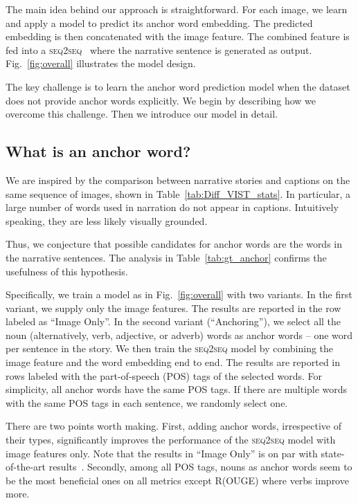 The main idea behind our approach is straightforward. For each image, we learn and apply a model to predict its anchor word embedding. The predicted embedding is then concatenated with the image feature. The combined feature is fed into a \textsc{seq2seq}~\cite{sutskever2014sequence} where the narrative sentence is generated as output. Fig.~\ref{fig:overall} illustrates the model design.

The key challenge is to learn the anchor word prediction model when the dataset does not provide anchor words explicitly. We begin by describing how we overcome this challenge. Then we introduce our model in detail.

\subsection{What is an anchor word?}

We are inspired by the comparison between narrative stories and captions on the same sequence of images, shown in Table~\ref{tab:Diff_VIST_stats}.  In particular, a large number of words used in narration do not appear in captions. Intuitively speaking, they are less likely visually grounded.

Thus, we conjecture that possible candidates for anchor words are the words in the narrative sentences. The analysis in Table~\ref{tab:gt_anchor} confirms the usefulness of this hypothesis.

Specifically,  we train a model as in Fig.~\ref{fig:overall} with two variants. In the first variant, we supply only the image features. The results are reported in the row labeled as ``Image Only''.   In the second variant (``Anchoring''), we select all the noun (alternatively, verb, adjective, or adverb) words as anchor words -- one word per sentence in the story. We then train the \textsc{seq2seq} model by combining the image feature and the word embedding end to end.  The results are reported in rows labeled with the part-of-speech  (POS) tags of the selected words. For simplicity, all anchor words have the same POS tags. If there are multiple words with the same POS tags in each sentence, we randomly select one.

There are two points worth making. First, adding anchor words, irrespective of their types, significantly improves the performance of the \textsc{seq2seq} model with image features only. Note that the results in ``Image Only'' is on par with state-of-the-art results~\cite{wang2018no}. Secondly, among all POS tags, nouns as anchor words seem to be the most beneficial ones on all metrics except R(OUGE) where verbs improve more.

